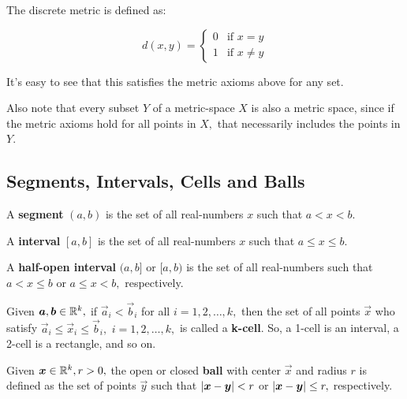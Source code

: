 \documentclass{article}
\begin{document}
\begin{definition}
The discrete metric is defined as:

\[ d(x, y) = \begin{cases}
0 & \text{if } x = y \\
1 & \text{if } x \neq y
\end{cases} \]
\end{definition}

\begin{remark}\label{discrete-metric-satisfies-axioms}
It's easy to see that this satisfies the metric axioms above for any set.

Also note that every \@{subset} $Y$ of a \@{metric-space} $X$ is also a metric space, since if the metric axioms hold for all points in $X,$ that necessarily includes the points in $Y.$
\end{remark}

\subsection{Segments, Intervals, Cells and Balls}

\begin{definition}[Segment]
A \textbf{segment} $(a, b)$ is the set of all \@{real-numbers} $x$ such that $a < x < b.$
\end{definition}

\begin{definition}[Interval]
A \textbf{interval} $[a, b]$ is the set of all \@{real-numbers} $x$ such that $a \leq x \leq b.$
\end{definition}

\begin{definition}
A \textbf{half-open interval} $(a,b]$ or $[a, b)$ is the set of all \@{real-numbers} such that $a < x \leq b$ or $a \leq x < b,$ respectively.
\end{definition}

\begin{definition}[k-cell]
Given $\boldsymbol{a}, \boldsymbol{b} \in \mathbb{R}^k,$ if $\vec{a}_i < \vec{b}_i$ for all $i = 1, 2, \dots, k,$ then the set of all points $\vec{x}$ who satisfy $\vec{a}_i \leq \vec{x}_i \leq \vec{b}_i,$ $i = 1, 2, \dots, k,$ is called a \textbf{k-cell}. So, a 1-cell is an \@{interval}, a 2-cell is a rectangle, and so on.
\end{definition}

\begin{definition}[Ball]
Given $\boldsymbol{x} \in \mathbb{R}^k, r > 0,$ the open or closed \textbf{ball} with center $\vec{x}$ and radius $r$ is defined as the set of points $\vec{y}$ such that $\left| \boldsymbol{x} - \boldsymbol{y} \right| < r$ or $\left| \boldsymbol{x} - \boldsymbol{y} \right| \leq r,$ respectively.
\end{definition}
\end{document}
